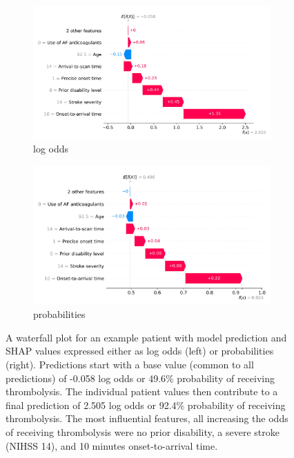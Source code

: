 \begin{figure}
    \centering
    \begin{subfigure}[b]{0.48\textwidth}
        \centering
        \includegraphics[width=\textwidth]{images/p2_waterfall_odds.jpg}
        \caption{log odds}
        \label{fig:waterfall_subfig1}
    \end{subfigure}
    \hfill
    \begin{subfigure}[b]{0.48\textwidth}
        \centering
        \includegraphics[width=\textwidth]{images/p2_waterfall_probs.jpg}
        \caption{probabilities}
        \label{fig:waterfall_subfig2}
    \end{subfigure}
    \caption{A waterfall plot for an example patient with model prediction and SHAP values expressed either as log odds (left) or probabilities (right). Predictions start with a base value (common to all predictions) of -0.058 log odds or 49.6\% probability of receiving thrombolysis. The individual patient values then contribute to a final prediction of 2.505 log odds or 92.4\% probability of receiving thrombolysis. The most influential features, all increasing the odds of receiving thrombolysis were no prior disability, a severe stroke (NIHSS 14), and 10 minutes onset-to-arrival time.}
    \label{fig:waterfall}
\end{figure}

